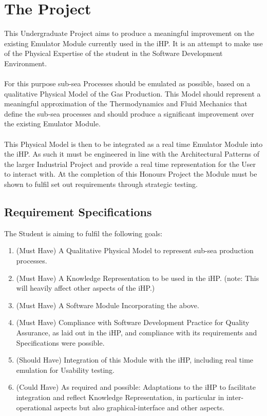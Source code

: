 \documentclass{article}
\begin{document}
\section{The Project}
This Undergraduate Project aims to produce a meaningful improvement on the existing Emulator Module currently used in the iHP. It is an attempt to make use of the Physical Expertise of the student in the Software Development Environment.
\\\\For this purpose sub-sea Processes should be emulated as possible, based on a qualitative Physical Model of the Gas Production. This Model should represent a meaningful approximation of the Thermodynamics and Fluid Mechanics that define the sub-sea processes and should produce a significant improvement over the existing Emulator Module.
\\\\ This Physical Model is then to be integrated as a real time Emulator Module into the iHP. As such it must be engineered in line with the Architectural Patterns of the larger Industrial Project and provide a real time representation for the User to interact with. At the completion of this Honours Project the Module must be shown to fulfil set out requirements through strategic testing.

\subsection{Requirement Specifications}
The Student is aiming to fulfil the following goals:

\begin{enumerate}
    \item (Must Have) A Qualitative Physical Model to represent sub-sea production processes.
    \item (Must Have) A Knowledge Representation to be used in the iHP. (note: This will heavily affect other aspects of the iHP.)
    \item (Must Have) A Software Module Incorporating the above.
    \item (Must Have) Compliance with Software Development Practice for Quality Assurance, as laid out in the iHP, and compliance with its requirements and Specifications were possible.
    \item (Should Have) Integration of this Module with the iHP, including real time emulation for Usability testing.
    \item (Could Have) As required and possible: Adaptations to the iHP to facilitate integration and reflect Knowledge Representation, in particular in inter-operational aspects but also graphical-interface and other aspects.
\end{enumerate}
\end{document}
